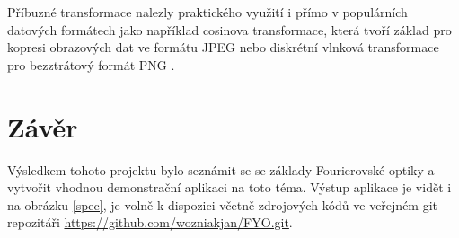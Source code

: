 \documentclass[11pt,a4paper]{article}
\begin{document}
Příbuzné transformace nalezly praktického využití i přímo v populárních datových formátech jako například
cosinova transformace, která tvoří základ pro kopresi obrazových dat ve formátu JPEG nebo diskrétní vlnková 
transformace pro bezztrátový formát PNG \cite{jpeg, png}.

\section{Závěr}
Výsledkem tohoto projektu bylo seznámit se se základy Fourierovské optiky a vytvořit vhodnou demonstrační
aplikaci na toto téma. Výstup aplikace je vidět i na obrázku \ref{spec}, je volně k dispozici včetně zdrojových
kódů ve veřejném git repozitáři \url{https://github.com/wozniakjan/FYO.git}.

\newpage


\end{document}
